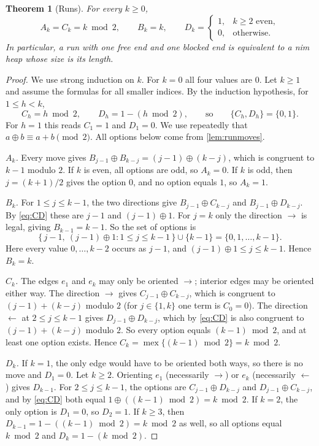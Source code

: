 \documentclass[11pt]{amsart}
\newtheorem{theorem}{Theorem}[section]
\theoremstyle{definition}
\theoremstyle{remark}
\newcommand{\mex}{\operatorname{mex}}
\newcommand{\rgt}{\rightarrow}
\newcommand{\lft}{\leftarrow}
\begin{document}
\begin{theorem}[Runs]\label{thm:runs}
For every $k\ge0$,
\[
  A_k=C_k=k \bmod 2,\qquad B_k=k,\qquad D_k=\begin{cases}1,& k\ge2 \text{ even},\\ 0,&\text{otherwise.}\end{cases}
\]
In particular, a run with one free end and one blocked end is equivalent to a nim heap whose size is its length.
\end{theorem}

\begin{proof}
We use strong induction on $k$. For $k=0$ all four values are $0$. Let $k\ge1$ and assume the formulas for all smaller indices. By the induction hypothesis, for $1\le h<k$,
\begin{equation}\label{eq:CD}
  C_h=h\bmod2,\qquad D_h=1-(h\bmod 2),\qquad\text{so}\qquad\{C_h,D_h\}=\{0,1\}.
\end{equation}
For $h=1$ this reads $C_1=1$ and $D_1=0$. We use repeatedly that $a\oplus b\equiv a+b\pmod 2$. All options below come from \cref{lem:runmoves}.

\smallskip\noindent\emph{$A_k$.} Every move gives $B_{j-1}\oplus B_{k-j}=(j-1)\oplus(k-j)$, which is congruent to $k-1$ modulo $2$. If $k$ is even, all options are odd, so $A_k=0$. If $k$ is odd, then $j=(k+1)/2$ gives the option $0$, and no option equals $1$, so $A_k=1$.

\smallskip\noindent\emph{$B_k$.} For $1\le j\le k-1$, the two directions give $B_{j-1}\oplus C_{k-j}$ and $B_{j-1}\oplus D_{k-j}$. By \eqref{eq:CD} these are $j-1$ and $(j-1)\oplus1$. For $j=k$ only the direction $\rgt$ is legal, giving $B_{k-1}=k-1$. So the set of options is
\[
  \{\,j-1,\ (j-1)\oplus 1 : 1\le j\le k-1\,\}\cup\{k-1\}=\{0,1,\dots,k-1\}.
\]
Here every value $0,\dots,k-2$ occurs as $j-1$, and $(j-1)\oplus 1\le j\le k-1$. Hence $B_k=k$.

\smallskip\noindent\emph{$C_k$.} The edges $e_1$ and $e_k$ may only be oriented $\rgt$; interior edges may be oriented either way. The direction $\rgt$ gives $C_{j-1}\oplus C_{k-j}$, which is congruent to $(j-1)+(k-j)$ modulo $2$ (for $j\in\{1,k\}$ one term is $C_0=0$). The direction $\lft$ at $2\le j\le k-1$ gives $D_{j-1}\oplus D_{k-j}$, which by \eqref{eq:CD} is also congruent to $(j-1)+(k-j)$ modulo $2$. So every option equals $(k-1)\bmod 2$, and at least one option exists. Hence $C_k=\mex\{(k-1)\bmod 2\}=k\bmod 2$.

\smallskip\noindent\emph{$D_k$.} If $k=1$, the only edge would have to be oriented both ways, so there is no move and $D_1=0$. Let $k\ge2$. Orienting $e_1$ (necessarily $\rgt$) or $e_k$ (necessarily $\lft$) gives $D_{k-1}$. For $2\le j\le k-1$, the options are $C_{j-1}\oplus D_{k-j}$ and $D_{j-1}\oplus C_{k-j}$, and by \eqref{eq:CD} both equal $1\oplus((k-1)\bmod 2)=k\bmod 2$. If $k=2$, the only option is $D_1=0$, so $D_2=1$. If $k\ge3$, then $D_{k-1}=1-((k-1)\bmod 2)=k\bmod 2$ as well, so all options equal $k\bmod2$ and $D_k=1-(k\bmod 2)$.
\end{proof}
\end{document}
